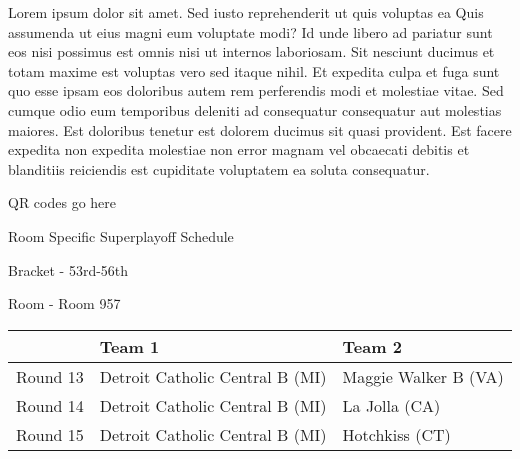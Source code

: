 \documentclass{article}%
\begin{document}
\vspace*{8pt}%
\newline%
Lorem ipsum dolor sit amet. Sed iusto reprehenderit ut quis voluptas ea Quis assumenda ut eius magni eum voluptate modi? Id unde libero ad pariatur sunt eos nisi possimus est omnis nisi ut internos laboriosam. Sit nesciunt ducimus et totam maxime est voluptas vero sed itaque nihil. Et expedita culpa et fuga sunt quo esse ipsam eos doloribus autem rem perferendis modi et molestiae vitae.\newline%
\newline%
Sed cumque odio eum temporibus deleniti ad consequatur consequatur aut molestias maiores. Est doloribus tenetur est dolorem ducimus sit quasi provident. Est facere expedita non expedita molestiae non error magnam vel obcaecati debitis et blanditiis reiciendis est cupiditate voluptatem ea soluta consequatur.%
\vspace*{140pt}%
\begin{center}%
\begin{Huge}%
QR codes go here%
\end{Huge}%
\end{center}%
\newpage%
\begin{center}%
\begin{Huge}%
Room Specific Superplayoff Schedule%
\end{Huge}%
\vspace*{8pt}%
\linebreak%
\begin{Large}%
Bracket {-} 53rd{-}56th%
\end{Large}%
\vspace*{8pt}%
\linebreak%
\vspace*{8pt}%
\begin{Large}%
Room {-} Room 957%
\end{Large}%
\end{center}%
%
\begin{tabularx}{\textwidth}{|c|Y|Y|}%
\hline%
&Team 1&Team 2\\%
\hline%
Round 13&Detroit Catholic Central B (MI)&Maggie Walker B (VA)\\%
Round 14&Detroit Catholic Central B (MI)&La Jolla (CA)\\%
Round 15&Detroit Catholic Central B (MI)&Hotchkiss (CT)\\%
\hline%
\end{tabularx}%
\vspace*{8pt}%
\end{document}
